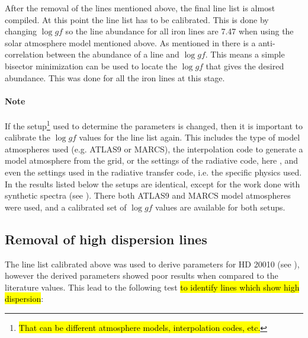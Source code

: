 After the removal of the lines mentioned above, the final line list is almost compiled. At this
point the line list has to be calibrated. This is done by changing $\log \mathit{gf}$ so the line
abundance for all iron lines are 7.47 when using the solar atmosphere model mentioned above. As
mentioned in  there is a anti-correlation between the abundance of a line and
$\log \mathit{gf}$. This means a simple bisector minimization can be used to locate the
$\log\mathit{gf}$ that gives the desired abundance. This was done for all the iron lines at this
stage.

\paragraph{Note}
If the setup\footnote{\hl{That can be different atmosphere models, interpolation codes, etc.}} used
to determine the parameters is changed, then it is important to calibrate the $\log \mathit{gf}$
values for the line list again. This includes the type of model atmospheres used (e.g. ATLAS9 or
MARCS), the interpolation code to generate a model atmosphere from the grid, or the settings of the
radiative code, here , and even the settings used in the radiative transfer code, i.e.
the specific physics used. In the results listed below the setups are identical, except for the work
done with synthetic spectra (see ). There both ATLAS9 and MARCS model
atmospheres were used, and a calibrated set of $\log \mathit{gf}$ values are available for both
setups.


\subsection{Removal of high dispersion lines}

The line list calibrated above was used to derive parameters for HD 20010 (see
), however the derived parameters showed poor results when compared to the
literature values. This lead to the following test \hl{to identify lines which show high
dispersion}:

